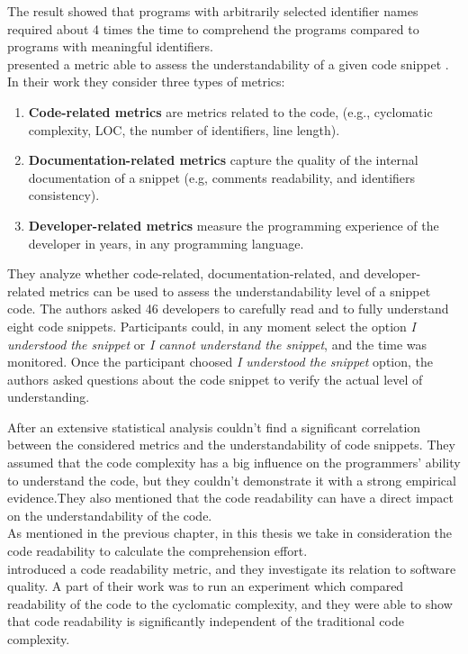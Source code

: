 \documentclass[12pt,mscthesis]{usiinfthesis}
\begin{document}
	The result showed that programs with arbitrarily selected identifier names required about 4 times the time to comprehend the programs compared to programs with meaningful identifiers.\\


	\citet{Scalabrino} presented a metric able to assess the understandability of a given code snippet . In their work they consider three types of metrics:
	\begin{enumerate}
		\item \textbf{Code-related metrics} are metrics related to the code, (e.g., cyclomatic complexity, LOC, the number of identifiers, line length).
		\item \textbf{Documentation-related metrics} capture the quality of the internal documentation of a snippet (e.g, comments readability, and identifiers consistency). 
		\item \textbf{Developer-related metrics} measure the programming experience of the developer in years, in any programming language.
	\end{enumerate}
	They analyze whether code-related, documentation-related, and developer- related metrics can be used to assess the understandability level of a snippet  code. The authors asked
	46 developers to carefully read and to fully understand eight code snippets. Participants could, in any moment select the option \textit{I understood the snippet} or \textit{I cannot understand the snippet}, and the time was monitored.
	Once the participant choosed \textit{I understood the snippet} option, the authors asked questions about the code snippet to verify the actual level of understanding.

	After an extensive statistical analysis \citet{Scalabrino} couldn't find a significant correlation between the considered metrics and the understandability of code snippets.
	They assumed that the code complexity has a big influence on the programmers' ability to understand the code, but they couldn't demonstrate it with a strong empirical evidence.They also mentioned that the code readability can have a direct impact on the understandability of the code.\\ As mentioned in the previous chapter, in this thesis we take in consideration the code readability to calculate the comprehension effort.\\

	\citet{Buse2010} introduced a code readability metric, and they investigate its relation to software quality. A part of their work was to run an experiment which compared readability of the code to the cyclomatic complexity, and they were able to show that code readability is significantly independent of the traditional code complexity.
\end{document}
